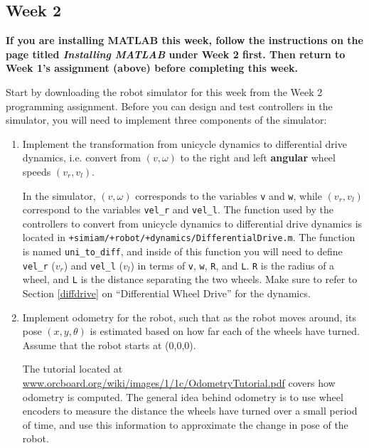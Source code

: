 \documentclass[10pt]{article}
\begin{document}
\newpage
\subsection{Week 2}
\label{sec:week-2}
\textbf{If you are installing MATLAB this week, follow the instructions on the page titled \emph{Installing MATLAB} under Week 2 first. Then return to Week 1's assignment (above) before completing this week.} 

Start by downloading the robot simulator for this week from the Week 2 programming assignment. Before you can design and test controllers in the simulator, you will need to implement three components of the simulator:

\begin{enumerate}
 \item Implement the transformation from unicycle dynamics to differential drive dynamics, i.e. convert from $(v,\omega)$ to the right and left \textbf{angular} wheel speeds $(v_r,v_l)$.
 
 In the simulator, $(v,\omega)$ corresponds to the variables \texttt{v} and \texttt{w}, while $(v_r,v_l)$ correspond to the variables \texttt{vel\_r} and \texttt{vel\_l}. The function used by the controllers to convert from unicycle dynamics to differential drive dynamics is located in \texttt{+simiam/+robot/+dynamics/DifferentialDrive.m}. The function is named \texttt{uni\_to\_diff}, and inside of this function you will need to define \texttt{vel\_r} ($v_r$) and \texttt{vel\_l} ($v_l$) in terms of \texttt{v}, \texttt{w}, \texttt{R}, and \texttt{L}. \texttt{R} is the radius of a wheel, and \texttt{L} is the distance separating the two wheels. Make sure to refer to Section \ref{diffdrive} on ``Differential Wheel Drive'' for the dynamics.
 
 \item Implement odometry for the robot, such that as the robot moves around, its pose $(x,y,\theta)$ is estimated based on how far each of the wheels have turned. Assume that the robot starts at (0,0,0).
 
 The tutorial located at \url{www.orcboard.org/wiki/images/1/1c/OdometryTutorial.pdf} covers how odometry is computed. The general idea behind odometry is to use wheel encoders to measure the distance the wheels have turned over a small period of time, and use this information to approximate the change in pose of the robot.


\end{enumerate}
\end{document}
